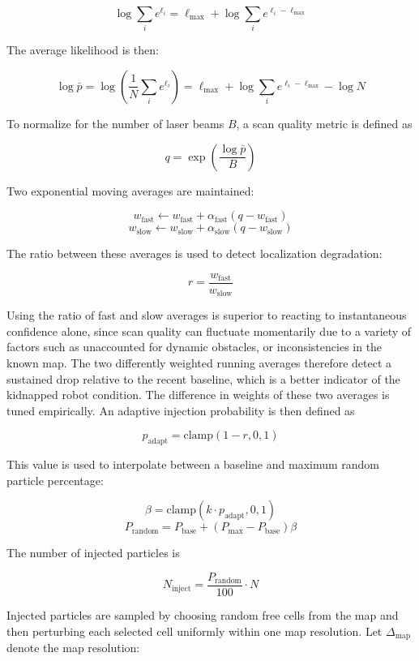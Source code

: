 \documentclass[11pt]{article}
\begin{document}
\[
\log \sum_i e^{\ell_i} = \ell_{\max} + \log \sum_i e^{\ell_i - \ell_{\max}}
\]

\noindent The average likelihood is then:

\[
\log \bar{p} = \log \left( \frac{1}{N} \sum_i e^{\ell_i} \right)
= \ell_{\max} + \log \sum_i e^{\ell_i - \ell_{\max}} - \log N
\]

\noindent To normalize for the number of laser beams \(B\), a scan quality metric is defined as

\[
q = \exp\left( \frac{\log \bar{p}}{B} \right)
\]

\noindent Two exponential moving averages are maintained:

\[
w_{\text{fast}} \leftarrow w_{\text{fast}} + \alpha_{\text{fast}} (q - w_{\text{fast}})
\]
\[
w_{\text{slow}} \leftarrow w_{\text{slow}} + \alpha_{\text{slow}} (q - w_{\text{slow}})
\]

\noindent The ratio between these averages is used to detect localization degradation:

\[
r = \frac{w_{\text{fast}}}{w_{\text{slow}}}
\]

\noindent Using the ratio of fast and slow averages is superior to reacting to instantaneous confidence alone,
          since scan quality can fluctuate momentarily due to a variety of factors such as unaccounted for dynamic obstacles, or inconsistencies in the known map. The
          two differently weighted running averages therefore detect a sustained drop relative to the recent baseline, which is a better indicator
          of the kidnapped robot condition. The difference in weights of these two averages is tuned empirically. An adaptive injection probability is then defined as

\[
p_{\text{adapt}} = \text{clamp}(1 - r, 0, 1)
\]

\noindent This value is used to interpolate between a baseline and maximum random particle percentage:

\[
\beta = \text{clamp}(k \cdot p_{\text{adapt}}, 0, 1)
\]
\[
P_{\text{random}} = P_{\text{base}} + (P_{\text{max}} - P_{\text{base}})\beta
\]

\noindent The number of injected particles is

\[
N_{\text{inject}} = \frac{P_{\text{random}}}{100} \cdot N
\]

\noindent Injected particles are sampled by choosing random free cells from the map and then perturbing each selected
          cell uniformly within one map resolution. Let \(\Delta_{\text{map}}\) denote the map resolution:
\end{document}
